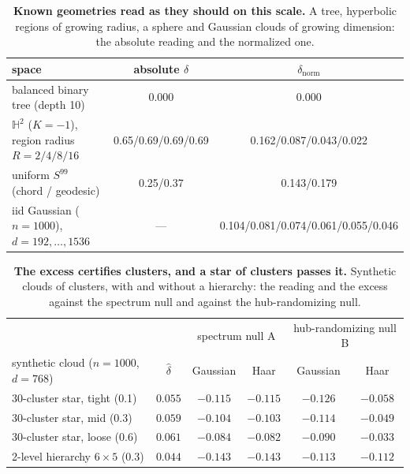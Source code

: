 \begin{table}[H]
\centering
\small
\setlength{\tabcolsep}{4pt}
\begin{tabular}{lcc}
\toprule
space & absolute $\delta$ & $\delta_{\text{norm}}$ \\
\midrule
balanced binary tree (depth 10) & 0.000 & 0.000 \\
$\mathbb{H}^2$ ($K{=}-1$), region radius $R{=}2/4/8/16$ & 0.65/0.69/0.69/0.69 & 0.162/0.087/0.043/0.022 \\
uniform $S^{99}$ (chord / geodesic) & 0.25/0.37 & 0.143/0.179 \\
iid Gaussian ($n{=}1000$), $d{=}192,\dots,1536$ & --- & 0.104/0.081/0.074/0.061/0.055/0.046 \\
\bottomrule
\end{tabular}
\par\vspace{2pt}
\caption{\textbf{Known geometries read as they should on this scale.} A tree, hyperbolic regions of growing radius, a sphere and Gaussian clouds of growing dimension: the absolute reading and the normalized one.
}
\label{tab:q10-calibration}
\end{table}
\begin{table}[H]
\centering
\small
\setlength{\tabcolsep}{4pt}
\begin{tabular}{lc|cc|cc}
\toprule
& & \multicolumn{2}{c|}{spectrum null A} & \multicolumn{2}{c}{hub-randomizing null B} \\
synthetic cloud ($n{=}1000$, $d{=}768$) & $\hat\delta$ & Gaussian & Haar & Gaussian & Haar \\
\midrule
30-cluster star, tight (0.1) & $0.055$ & $-0.115$ & $-0.115$ & $-0.126$ & $-0.058$ \\
30-cluster star, mid (0.3) & $0.059$ & $-0.104$ & $-0.103$ & $-0.114$ & $-0.049$ \\
30-cluster star, loose (0.6) & $0.061$ & $-0.084$ & $-0.082$ & $-0.090$ & $-0.033$ \\
2-level hierarchy $6\times5$ (0.3) & $0.044$ & $-0.143$ & $-0.143$ & $-0.113$ & $-0.112$ \\
\bottomrule
\end{tabular}
\par\vspace{2pt}
\caption{\textbf{The excess certifies clusters, and a star of clusters passes it.} Synthetic clouds of clusters, with and without a hierarchy: the reading and the excess against the spectrum null and against the hub-randomizing null.
}
\label{tab:q10-calibration-b}
\end{table}
